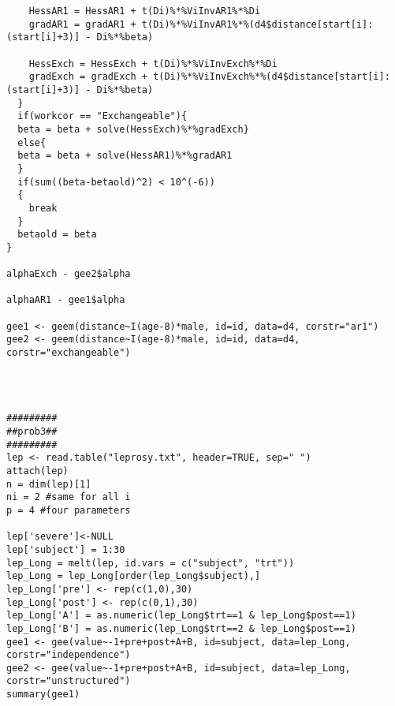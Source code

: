 \documentclass[11pt]{article}
\begin{document}
\begin{verbatim}
    HessAR1 = HessAR1 + t(Di)%*%ViInvAR1%*%Di
    gradAR1 = gradAR1 + t(Di)%*%ViInvAR1%*%(d4$distance[start[i]:(start[i]+3)] - Di%*%beta)
  
    HessExch = HessExch + t(Di)%*%ViInvExch%*%Di
    gradExch = gradExch + t(Di)%*%ViInvExch%*%(d4$distance[start[i]:(start[i]+3)] - Di%*%beta)
  }
  if(workcor == "Exchangeable"){
  beta = beta + solve(HessExch)%*%gradExch}
  else{
  beta = beta + solve(HessAR1)%*%gradAR1
  }
  if(sum((beta-betaold)^2) < 10^(-6))
  {
    break
  }
  betaold = beta
}

alphaExch - gee2$alpha

alphaAR1 - gee1$alpha

gee1 <- geem(distance~I(age-8)*male, id=id, data=d4, corstr="ar1")
gee2 <- geem(distance~I(age-8)*male, id=id, data=d4, corstr="exchangeable")




#########
##prob3##
#########
lep <- read.table("leprosy.txt", header=TRUE, sep=" ")
attach(lep)
n = dim(lep)[1]
ni = 2 #same for all i
p = 4 #four parameters

lep['severe']<-NULL
lep['subject'] = 1:30
lep_Long = melt(lep, id.vars = c("subject", "trt"))
lep_Long = lep_Long[order(lep_Long$subject),]
lep_Long['pre'] <- rep(c(1,0),30)
lep_Long['post'] <- rep(c(0,1),30)
lep_Long['A'] = as.numeric(lep_Long$trt==1 & lep_Long$post==1)
lep_Long['B'] = as.numeric(lep_Long$trt==2 & lep_Long$post==1)
gee1 <- gee(value~-1+pre+post+A+B, id=subject, data=lep_Long, corstr="independence")
gee2 <- gee(value~-1+pre+post+A+B, id=subject, data=lep_Long, corstr="unstructured")
summary(gee1)
	
\end{verbatim}
\end{document}
